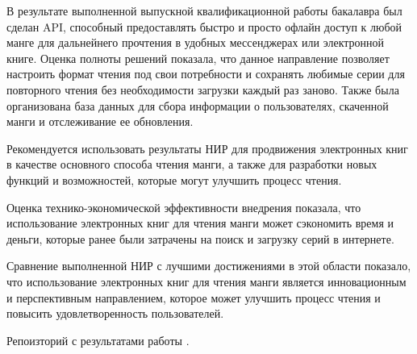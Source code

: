 \conclusion

В результате выполненной выпускной квалификационной работы бакалавра был сделан API, способный предоставлять быстро и просто офлайн доступ к любой манге для дальнейнего прочтения в удобных мессенджерах или электронной книге.
Оценка полноты решений показала, что данное направление позволяет настроить формат чтения под свои потребности и сохранять любимые серии для повторного чтения без необходимости загрузки каждый раз заново.
Также была организована база данных для сбора информации о пользователях, скаченной манги и отслеживание ее обновления.

Рекомендуется использовать результаты НИР для продвижения электронных книг в качестве основного способа чтения манги, 
а также для разработки новых функций и возможностей, которые могут улучшить процесс чтения.

Оценка технико-экономической эффективности внедрения показала, что использование электронных книг для чтения манги может сэкономить время и деньги, 
которые ранее были затрачены на поиск и загрузку серий в интернете.

Сравнение выполненной НИР с лучшими достижениями в этой области показало, 
что использование электронных книг для чтения манги является инновационным и перспективным направлением, 
которое может улучшить процесс чтения и повысить удовлетворенность пользователей.

Репоизторий с результатами работы \cite{result-cite}.